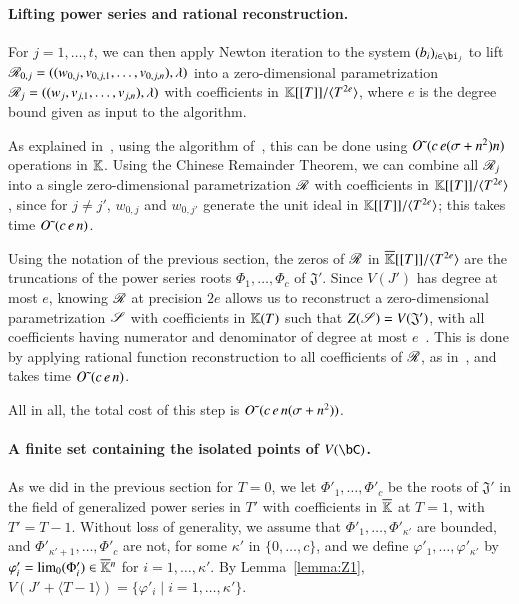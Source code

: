\documentclass[amsthm]{elsart}
\begin{document}
\paragraph*{Lifting power series and rational reconstruction.}
For $j=1,\dots,t$, we can then apply Newton iteration to the system
$(b_i)_{i \in \bi_j}$ to lift
$\mathscr{R}_{0,j}=((w_{0,j},v_{0,j,1},\dots,v_{0,j,n}),\lambda)$ into a
zero-dimensional parametrization
$\mathscr{R}_{j}=((w_{j},v_{j,1},\dots,v_{j,n}),\lambda)$ with coefficients
in $\mathbb{K}[[T]]/\langle T^{2e}\rangle$, where $e$ is the degree bound given
as input to the algorithm.

As explained in~\cite[Section~2.2]{SaSc16}, using the algorithm
of~\cite{GiLeSa01}, this can be done using ${O}{\,\tilde{ }\,}(c\,e (\sigma+n^2)n)$
operations in $\mathbb{K}$.  Using the Chinese Remainder Theorem, we can
combine all $\mathscr{R}_{j}$ into a single zero-dimensional parametrization
$\mathscr{R}$ with coefficients in $\mathbb{K}[[T]]/\langle T^{2e}\rangle$, since
for $j\ne j'$, $w_{0,j}$ and $w_{0,j'}$ generate the unit ideal in
$\mathbb{K}[[T]]/\langle T^{2e}\rangle$; this takes time 
${O}{\,\tilde{ }\,}(c\,e\,n)$.

Using the notation of the previous section, the zeros of $\mathscr{R}$ in
$\overline{\mathbb{K}}[[T]]/\langle T^{2e}\rangle$ are the truncations of the power
series roots $\Phi_1,\dots,\Phi_c$ of $\mathfrak{J}'$. Since $V(J')$ has
degree at most $e$, knowing $\mathscr{R}$ at precision $2e$ allows us to
reconstruct a zero-dimensional parametrization $\mathscr{S}$ with
coefficients in $\mathbb{K}(T)$ such that $Z(\mathscr{S})=V(\mathfrak{J}')$,
with all coefficients having numerator and denominator of degree at
most $e$~\cite[Theorem~1]{Schost03}.  This is done by applying
rational function reconstruction to all coefficients of $\mathscr{R}$, as
in~\cite{Schost03}, and takes time ${O}{\,\tilde{ }\,}(c\,e\,n)$.

All in all, the total cost of this step is ${O}{\,\tilde{ }\,}(c\,e\,n (\sigma+n^2))$.

\paragraph*{A finite set containing the isolated points of $V(\bC)$.}
As we did in the previous section for $T=0$, we let
$\Phi'_1,\dots,\Phi'_c$ be the roots of $\mathfrak{J}'$ in the field
of generalized power series in $T'$ with coefficients in $\overline{\mathbb{K}}$ at
$T=1$, with $T'=T-1$. Without loss of generality, we assume that
$\Phi'_1,\dots,\Phi'_{\kappa'}$ are bounded, and
$\Phi'_{\kappa'+1},\dots,\Phi'_c$ are not, for some $\kappa'$ in
$\{0,\dots,c\}$, and we define $\varphi'_1,\dots,\varphi'_{\kappa'}$
by $\varphi'_i=\lim_0(\Phi'_i)\in\overline{\mathbb{K}}{}^n$ for $i=1,\dots,\kappa'$.
By Lemma~\ref{lemma:Z1},
$V(J' + \langle T-1\rangle) = \{ \varphi'_i \mid i=1,\dots,\kappa'\}$.
\end{document}

